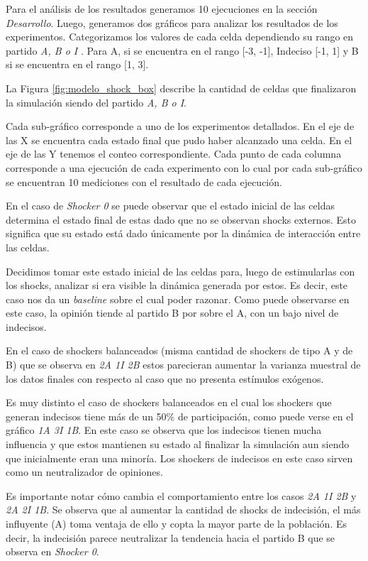Para el análisis de los resultados generamos 10 ejecuciones 
en la sección \textit{Desarrollo}.
Luego, generamos dos gráficos para analizar los resultados de los experimentos.
Categorizamos los valores de cada celda dependiendo su rango en partido
\textit{A, B o I }. Para A, si se encuentra en el rango [-3, -1], Indeciso [-1, 1]  y B si se encuentra en el rango [1, 3].

La Figura \ref{fig:modelo_shock_box} describe la cantidad de celdas que
finalizaron la simulación siendo del partido \textit{A, B o I}.

Cada sub-gráfico corresponde a uno de los experimentos detallados. En el eje de
las X se encuentra cada estado final que pudo haber alcanzado una celda. En el
eje de las Y tenemos el conteo correspondiente.  Cada punto de cada columna
corresponde a una ejecución de cada experimento con lo cual por cada
sub-gráfico se encuentran 10 mediciones con el resultado de cada ejecución.


En el caso de \textit{Shocker 0} se puede observar que el estado inicial de las
celdas determina el estado final de estas dado que no se observan shocks
externos. Esto significa que su estado está dado únicamente por la dinámica de
interacción entre las celdas.

Decidimos tomar este estado inicial de las celdas para, luego de estimularlas
con los shocks, analizar si era visible la dinámica generada por estos.
Es decir, este caso nos da un \textit{baseline} sobre el cual poder razonar. Como puede observarse en este caso, la opinión tiende al partido B por sobre el A, con un bajo nivel de indecisos.

En el caso de shockers balanceados (misma cantidad de shockers de tipo A  y de
B) que se observa en \textit{2A 1I 2B} estos
parecieran aumentar la varianza muestral de los datos finales con respecto al
caso que no presenta estímulos exógenos.

Es muy distinto el caso de shockers balanceados en el cual los shockers que generan indecisos tiene más de un 50\% de participación, como puede verse en el gráfico \textit{1A 3I 1B}.
En este caso se observa que los indecisos tienen mucha influencia y que estos
mantienen su estado al finalizar la simulación aun siendo que inicialmente eran una minoría.
Los shockers de indecisos en este caso sirven como un neutralizador de opiniones.

Es importante notar cómo cambia el comportamiento entre los casos \textit{2A 1I 2B} y \textit{2A 2I 1B}. Se observa que al aumentar la cantidad de shocks de indecisión, el más influyente (A) toma ventaja de ello y copta la mayor parte de la población. Es decir, la indecisión parece neutralizar la tendencia hacia el partido B que se observa en \textit{Shocker 0}. 



